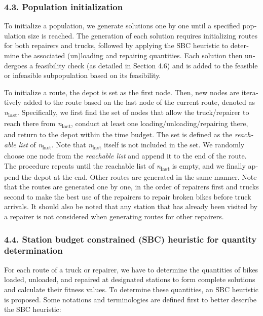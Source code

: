 \documentclass[
  english,
]{article}
\begin{document}
\begin{otherlanguage}{english}
\protect{}\label{s0060}
\subsubsection{4.3. Population initialization}\label{st080}

\protect{}\label{p0315}
To initialize a population, we generate solutions one by one until a specified population size is
reached. The generation of each solution requires initializing routes for both repairers and trucks,
followed by applying the SBC heuristic to determine the associated (un)loading and repairing
quantities. Each solution then undergoes a feasibility check (as detailed in Section 4.6) and is
added to the feasible or infeasible subpopulation based on its feasibility.

\protect{}\label{p0320}
To initialize a route, the depot is set as the first node. Then, new nodes are iteratively added to
the route based on the last node of the current route, denoted as \emph{n}\textsubscript{last}.
Specifically, we first find the set of nodes that allow the truck/repairer to reach there from
\emph{n}\textsubscript{last}, conduct at least one loading/unloading/repairing there, and return to
the depot within the time budget. The set is defined as the \emph{reachable list} of
\emph{n}\textsubscript{last}. Note that \emph{n}\textsubscript{last} itself is not included in the
set. We randomly choose one node from the \emph{reachable list} and append it to the end of the
route. The procedure repeats until the reachable list of \emph{n}\textsubscript{last} is empty, and
we finally append the depot at the end. Other routes are generated in the same manner. Note that the
routes are generated one by one, in the order of repairers first and trucks second to make the best
use of the repairers to repair broken bikes before truck arrivals. It should also be noted that any
station that has already been visited by a repairer is not considered when generating routes for
other repairers.

\protect{}\label{s0065}
\subsubsection{4.4. Station budget constrained (SBC) heuristic for quantity
determination}\label{st085}

\protect{}\label{p0325}
For each route of a truck or repairer, we have to determine the quantities of bikes loaded,
unloaded, and repaired at designated stations to form complete solutions and calculate their fitness
values. To determine these quantities, an SBC heuristic is proposed. Some notations and
terminologies are defined first to better describe the SBC heuristic:


\end{otherlanguage}
\end{document}
